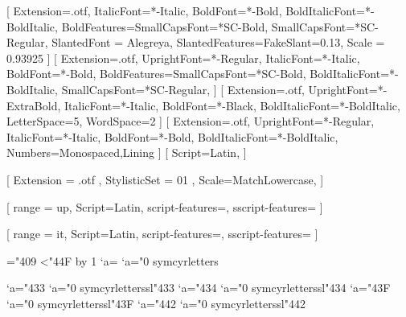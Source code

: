 
% 
%


\setmainfont{Alegreya}[
  Extension=.otf,
  ItalicFont=*-Italic,
  BoldFont=*-Bold,
  BoldItalicFont=*-BoldItalic,
  BoldFeatures={SmallCapsFont=*SC-Bold},
  SmallCapsFont=*SC-Regular,
  SlantedFont = Alegreya,
  SlantedFeatures={FakeSlant=0.13},
  Scale = 0.93925
]
\setsansfont{AlegreyaSans}[
  Extension=.otf,
  UprightFont=*-Regular,
  ItalicFont=*-Italic,
  BoldFont=*-Bold,
  BoldFeatures={SmallCapsFont=*SC-Bold},
  BoldItalicFont=*-BoldItalic,
  SmallCapsFont=*SC-Regular,
]
[
  Extension=.otf,
  UprightFont=*-ExtraBold,
  ItalicFont=*-Italic,
  BoldFont=*-Black,
  BoldItalicFont=*-BoldItalic,
  LetterSpace=5,
  WordSpace=2
]
[
  Extension=.otf,
  UprightFont=*-Regular,
  ItalicFont=*-Italic,
  BoldFont=*-Bold,
  BoldItalicFont=*-BoldItalic,
  Numbers={Monospaced,Lining}
]
[
  Script=Latin,
]

% 
%

\usepackage{unicode-math}

[%
  Extension = .otf ,
  StylisticSet = 01 ,
  Scale=MatchLowercase,
]

[%
  range = {up},
  Script=Latin,
  script-features={},
  sscript-features={}
]

[%
  range = {it},
  Script=Latin,
  script-features={},
  sscript-features={}
]

\newcommand{\makecyrmathletter}[1]{%
  \begingroup\lccode`a=#1\lowercase{\endgroup
  \Umathcode`a}="0 \csname symcyrletters\endcsname\space #1
}
="409
\loop\ifnum{}<"44F
  \advance{} by 1
  \makecyrmathletter{\count255}
\repeat


\newcommand{\makecyrmathlettersl}[1]{%
  \begingroup\lccode`a=#1\lowercase{\endgroup
  \Umathcode`a}="0 \csname symcyrletterssl\endcsname\space #1
}
\makecyrmathlettersl{"433} %
\makecyrmathlettersl{"434} %
\makecyrmathlettersl{"43F} %
\makecyrmathlettersl{"442} %
